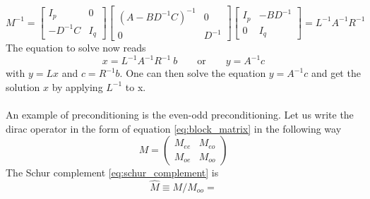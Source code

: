\begin{equation*}
M^{-1} = \left[\begin{array}{cc}
I_p & 0 \\
-D^{-1} C & I_q
\end{array}\right]\left[\begin{array}{cc}
\left(A-B D^{-1} C\right)^{-1} & 0 \\
0 & D^{-1}
\end{array}\right]\left[\begin{array}{cc}
I_p & -B D^{-1} \\
0 & I_q
\end{array}\right]
= L^{-1} A^{-1} R^{-1}
\end{equation*}
The equation to solve now reads
\begin{equation*}
x = L^{-1} A^{-1} R^{-1} \ b \qquad \text{or} \qquad  y = A^{-1} c
\end{equation*}
with $y = L x$ and $c = R^{-1} b$. One can then solve the equation $y = A^{-1}c$ and get the solution $x$ by applying $L^{-1}$ to x. \\~\\
An example of preconditioning is the even-odd preconditioning. Let us write the dirac operator in the form of equation \eqref{eq:block_matrix} in the following way
\begin{equation*}
     M = \begin{pmatrix*}
        M_{ee} & M_{eo} \\ M_{oe} & M_{oo}
    \end{pmatrix*}
\end{equation*}
The Schur complement \eqref{eq:schur_complement} is 
\begin{equation*}
    \hat M \equiv M/M_{oo} = 
\end{equation*}

